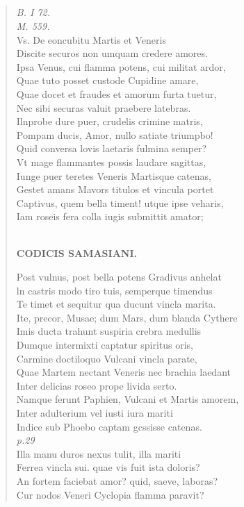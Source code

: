 \documentclass[11pt, a4paper]{report}
\begin{document}
            \subsection*{}
      \begin{verse}
      \textit{B. I 72.} \\ \textit{M. 559.} \\ Vs. De eoncubitu Martis et Veneris \\ Discite securos non umquam credere amores. \\ Ipsa Venus, cui flamma potens, cui militat ardor, \\ Quae tuto posset custode Cupidine amare, \\ Quae docet et fraudes et amorum furta tuetur, \\ Nec sibi securas valuit praebere latebras. \\ Ilnprobe dure puer, crudelis crimine matris, \\ Pompam ducis, Amor, nullo satiate triumpbo! \\ Quid conversa lovis laetaris fulmina semper? \\ Vt mage flammantes possis laudare sagittas, \\ Iunge puer teretes Veneris Martisque catenas, \\ Gestet amans Mavors titulos et vincula portet \\ Captivus, quem bella timent! utque ipse veharis, \\ Iam roseis fera colla iugis submittit amator; \\ 
        ﻿\pagebreak 
    \begin{center} \textbf{CODICIS SAMASIANI.} \end{center} \marginpar{[203]} Post vulnus, post bella potens Gradivus anhelat \\ ln castris modo tiro tuis, semperque timendus \\ Te timet et sequitur qua ducunt vincla marita. \\ Ite, precor, Musae; dum Mars, dum blanda Cythere \\ Imis ducta trahunt suspiria crebra medullis \\ Dumque intermixti captatur spiritus oris, \\ Carmine doctiloquo Vulcani vincla parate, \\ Quae Martem nectant Veneris nec brachia laedant \\ Inter delicias roseo prope livida serto. \\ Namque ferunt Paphien, Vulcani et Martis amorem, \\ Inter adulterium vel iusti iura mariti \\ Indice sub Phoebo captam gcssisse catenas. \\ \textit{p.29} \\ Illa manu duros nexus tulit, illa mariti \\ Ferrea vincla sui. quae vis fuit ista doloris? \\ An fortem faciebat amor? quid, saeve, laboras? \\ Cur nodos Veneri Cyclopia flamma paravit? \\ 
      \end{verse}
  
\end{document}
